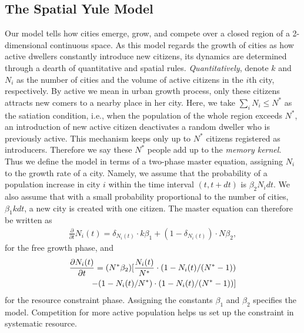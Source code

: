 \documentclass[reprint,unsortedaddress,amsmath,amssymb,aps,prl,showkeys]{revtex4-2}
\begin{document}
\subsection{The Spatial Yule Model}
Our model tells how cities emerge, grow, and compete over a closed region of a 2-dimensional continuous space. As this model regards the growth of cities as how active dwellers constantly introduce new citizens, its dynamics are determined through a dearth of quantitative and spatial rules. \emph{Quantitatively}, denote $k$ and $N_i$ as the number of cities and the volume of active citizens in the $i$th city, respectively. By active we mean in urban growth process, only these citizens attracts new comers to a nearby place in her city. Here, we take $\sum_{i} N_i \le N^*$ as the satiation condition, i.e., when the population of the whole region exceeds $N^*$, an introduction of new active citizen deactivates a random dweller who is previously active. This mechanism keeps only up to $N^*$ citizens registered as introducers. Therefore we say these $N^*$ people add up to the \emph{memory kernel}. Thus we define the model in terms of a two-phase master equation, assigning $N_i$ to the growth rate of a city. Namely, we assume that the probability of a population increase in city $i$ within the time interval $(t,t+dt)$ is $\beta_2N_idt$. We also assume that with a small probability proportional to the number of cities, $\beta_1kdt$, a new city is created with one citizen. The master equation can therefore be written as \begin{align}\frac{\partial}{\partial t}N_i(t) =  \delta_{N_i(t)}\cdot k\beta_1+ (1-\delta_{N_i(t)})\cdot N\beta_2, \end{align} for the free growth phase, and \begin{align}
	\frac{\partial N_i(t)}{\partial t}  = (N^*\beta_2)[\frac{N_i(t)}{N^*}\cdot(1-N_i(t)/(N^*-1))& \notag\\  - (1-N_i(t)/N^*)\cdot (1-N_i(t)/(N^*-1)) ]&
\end{align}
for the resource constraint phase. Assigning the constants $\beta_1$ and $\beta_2$ specifies the model. Competition for more active population helps us set up the constraint in systematic resource. 
\end{document}

